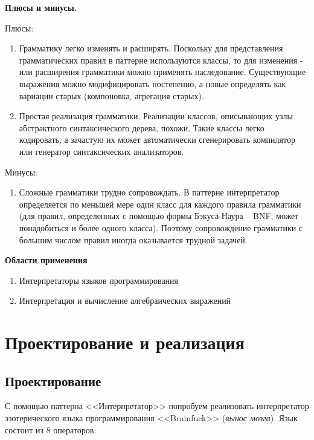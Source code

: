 \documentclass[PI,LAB]{HSEUniversity}
\begin{document}
\textbf{Плюсы и минусы.}

Плюсы:
\begin{enumerate}
	\item Грамматику легко изменять и расширять. Поскольку для представления грамматических правил в паттерне используются классы, то для изменения - или расширения грамматики можно применять наследование. Существующие выражения можно модифицировать постепенно, а новые определять как вариации старых (компоновка, агрегация старых).
	\item Простая реализация грамматики. Реализации классов, описывающих узлы абстрактного синтаксического дерева, похожи. Такие классы легко кодировать, а зачастую их может автоматически сгенерировать компилятор или генератор синтаксических анализаторов.
\end{enumerate}

Минусы:
\begin{enumerate}
	\item Сложные грамматики трудно сопровождать. В паттерне интерпретатор определяется по меньшей мере один класс для каждого правила грамматики (для правил, определенных с помощью формы Бэкуса-Наура – BNF, может понадобиться и более одного класса). Поэтому сопровождение грамматики с большим числом правил иногда оказывается трудной задачей.
\end{enumerate}

\textbf{Области применения}

\begin{enumerate}
	\item Интерпретаторы языков программирования
	\item Интерпретация и вычисление алгебраических выражений
\end{enumerate}

\chapter{Проектирование и реализация}
\section{Проектирование}
С помощью паттерна <<Интерпретатор>> попробуем реализовать интерпретатор эзотерического языка программирования <<Brainfuck>> (\emph{вынос мозга}).
Язык состоит из 8 операторов:
\end{document}

